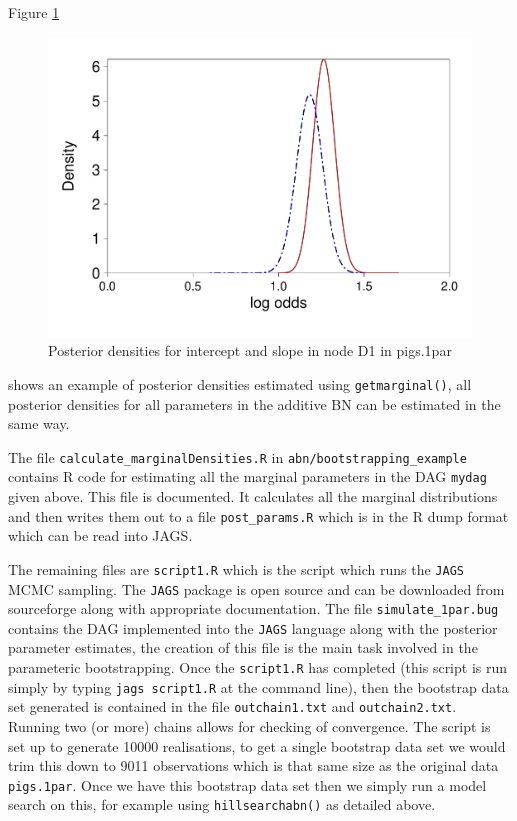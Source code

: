 \documentclass[nojss]{jss}
\begin{document}
Figure \ref{fig6}
\begin{figure}[htbp]
\includegraphics{abn-017}
\caption{Posterior densities for intercept and slope in node D1 in pigs.1par} \label{fig6}
\end{figure}
shows an example of posterior densities estimated using {\tt getmarginal()}, all posterior densities for all parameters in the additive BN can be estimated in the same way.

The file {\tt calculate\_marginalDensities.R} in {\tt abn/bootstrapping\_example} contains R code for estimating all the marginal parameters in the DAG {\tt mydag} given above. This file is documented. It calculates all the marginal distributions and then writes them out to a file {\tt post\_params.R} which is in the R dump format which can be read into {JAGS}.

The remaining files are {\tt script1.R} which is the script which runs the {\tt JAGS} MCMC sampling. The {\tt JAGS} package is open source and can be downloaded from sourceforge along with appropriate documentation. The file {\tt simulate\_1par.bug} contains the DAG implemented into the {\tt JAGS} language along with the posterior parameter estimates, the creation of this file is the main task involved in the parameteric bootstrapping. Once the {\tt script1.R} has completed (this script is run simply by typing {\tt jags script1.R} at the command line), then the bootstrap data set generated is contained in the file {\tt outchain1.txt} and {\tt outchain2.txt}. Running two (or more) chains allows for checking of convergence. The script is set up to generate 10000 realisations, to get a single bootstrap data set we would trim this down to 9011 observations which is that same size as the original data {\tt pigs.1par}. Once we have this bootstrap data set then we simply run a model search on this, for example using {\tt hillsearchabn()} as detailed above.  
\end{document}
